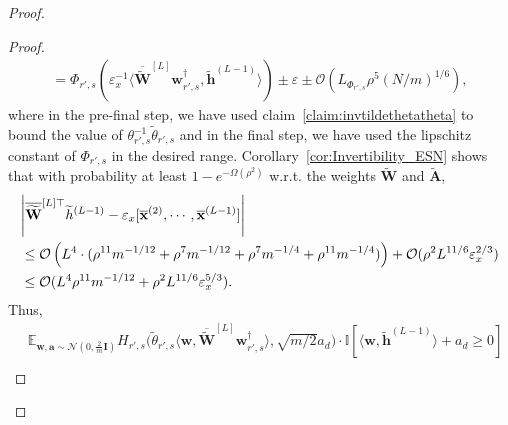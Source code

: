 \begin{claim}
\begin{proof}
\begin{proof}
\begin{align*}
						= \Phi_{r', s} \left( \varepsilon_x^{-1}  \langle \overline{\widetilde{\mathbf{W}}}^{[L]} \mathbf{w}_{r', s}^{\dagger}, \mathbf{\widetilde{h}}^{(L-1)}  \rangle  \right) \pm \varepsilon \pm \mathcal{O}(L_{\Phi_{r',s}} \rho^5 (N/m)^{1/6}),
					\end{align*}
					\endgroup
					where in the pre-final step, we have used claim~\ref{claim:invtildethetatheta} to bound the value of $\theta_{r', s}^{-1} \widetilde{\theta}_{r', s}$ and in the final step, we have used the lipschitz constant of $\Phi_{r', s}$ in the desired range. Corollary~\ref{cor:Invertibility_ESN} shows that with probability at least $1 - e^{-\Omega(\rho^2)}$ w.r.t. the weights $\widetilde{\mathbf{W}}$ and $\widetilde{\mathbf{A}}$, 
					\begin{align*}
						&\abs{\overline{\widetilde{\mathbf{W}}}^{[L]\top} \widetilde{h}^{(L-1)} - \varepsilon_x[\overline{\mathbf{x}}^{(2)}, 
							\cdots, \overline{\mathbf{x}}^{(L-1)}]}  \\&\le \mathcal{O}\left(L^4 \cdot (\rho^{11} m^{-1/12} + \rho^{7} m^{-1/12} + \rho^{7} m^{-1/4} + \rho^{11} m^{-1/4})  \right) + \mathcal{O}(\rho^2 L^{11/6} \varepsilon_x^{2/3}) \\&
						\le  \mathcal{O}(L^4 \rho^{11} m^{-1/12} + \rho^2 L^{11/6} \varepsilon_x^{5/3}). 
					\end{align*}
					Thus,
					\begingroup \allowdisplaybreaks
					\begin{align*}
						&\mathbb{E}_{\mathbf{w}, \mathbf{a} \sim \mathcal{N}(0, \frac{2}{m}\mathbf{I})}  H_{r', s}\Big(\widetilde{\theta}_{r', s} \langle \mathbf{w}, \overline{\widetilde{\mathbf{W}}}^{[L]} \mathbf{w}_{r', s}^{\dagger}\rangle , \sqrt{m/2} a_{d}\Big)  \cdot\mathbb{I} \left[ \langle \mathbf{w},  \widetilde{\mathbf{h}}^{(L-1)}\rangle + a_{d}  \ge 0 \right] \\&

\end{align*}
\end{proof}
\end{proof}
\end{claim}
